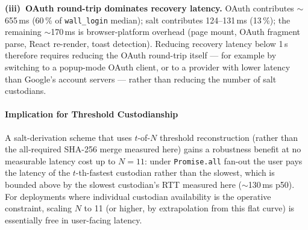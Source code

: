 \textbf{(iii)~OAuth round-trip dominates recovery latency.} OAuth
contributes $\sim$655\,ms (60\,\% of \texttt{wall\_login} median);
salt contributes 124--131\,ms (13\,\%); the remaining $\sim$170\,ms is
browser-platform overhead (page mount, OAuth fragment parse, React
re-render, toast detection). Reducing recovery latency below 1\,s
therefore requires reducing the OAuth round-trip itself — for example
by switching to a popup-mode OAuth client, or to a provider with
lower latency than Google's account servers — rather than reducing the
number of salt custodians.

\paragraph{Implication for Threshold Custodianship}

A salt-derivation scheme that uses $t$-of-$N$ threshold reconstruction
(rather than the all-required SHA-256 merge measured here) gains a
robustness benefit at no measurable latency cost up to $N=11$: under
\texttt{Promise.all} fan-out the user pays the latency of the
$t$-th-fastest custodian rather than the slowest, which is bounded above
by the slowest custodian's RTT measured here ($\sim$130\,ms p50). For
deployments where individual custodian availability is the operative
constraint, scaling $N$ to 11 (or higher, by extrapolation from this
flat curve) is essentially free in user-facing latency.
